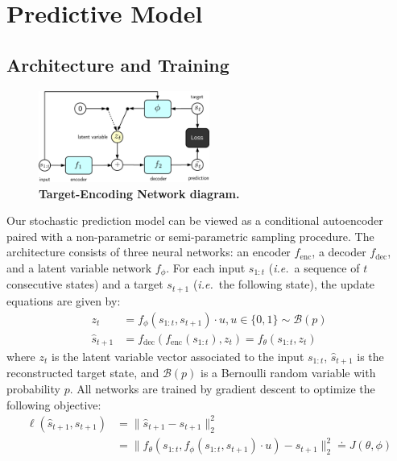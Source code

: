 \documentclass{article}
\begin{document}
\section{Predictive Model}

\subsection{Architecture and Training}

\begin{figure}
  \centering
  \includegraphics[width=0.5\textwidth]{images/ae_train-crop.pdf}
  \caption{
    \textbf{Target-Encoding Network diagram.}
  }
\end{figure}

Our stochastic prediction model can be viewed as a conditional autoencoder paired with a non-parametric  or semi-parametric sampling procedure.
The architecture consists of three neural networks: an encoder $f_\text{enc}$, a decoder $f_\text{dec}$, and a latent variable network $f_\phi$.
For each input $s_{1:t}$ (\emph{i.e.}\ a sequence of $t$ consecutive states) and a target $s_{t+1}$ (\emph{i.e.}\ the following state), the update equations are given by:
%
\begin{align}
  \label{eq:update-eqn}
  z_t &= f_\phi(s_{1:t}, s_{t+1}) \cdot u, u \in \{0, 1\} \sim \mathcal{B}(p) \\
  \hat{s}_{t+1} &= f_\text{dec}(f_\text{enc}(s_{1:t}), z_t) = f_\theta(s_{1:t}, z_t)
\end{align}
%
where $z_t$ is the latent variable vector associated to the input $s_{1:t}$, $\hat{s}_{t + 1}$ is the reconstructed target state, and $\mathcal{B}(p)$ is a Bernoulli random variable with probability $p$.
All networks are trained by gradient descent to optimize the following objective:
%
\begin{align}
  \ell(\hat{s}_{t+1}, s_{t+1}) &= \lVert \hat{s}_{t+1} - s_{t+1} \rVert_2^2 \\
  &= \lVert f_\theta(s_{1:t}, f_\phi(s_{1:t}, s_{t+1}) \cdot u) - s_{t+1} \rVert_2^2 \doteq J(\theta, \phi)
\end{align}
\end{document}
